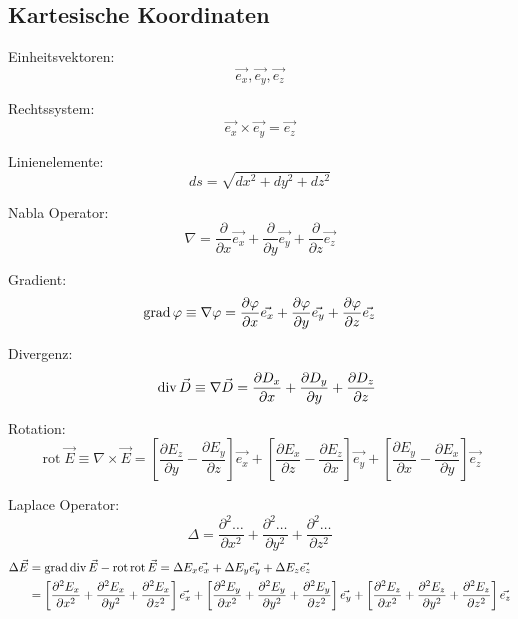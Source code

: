 \subsection{Kartesische Koordinaten}
\begin{description}
	\item Einheitsvektoren:
	      \[
		      \vec{e_{x}}, \vec{e_{y}}, \vec{e_{z}}
	      \]
	\item Rechtssystem:
	      \[
		      \vec{e_{x}} \times \vec{e_{y}}=\vec{e_{z}}
	      \]
	\item Linienelemente:
	      \[
		      ds=\sqrt{d x^{2}+d y^{2}+d z^{2}}
	      \]
	\item Nabla Operator:
	      \[
		      \nabla=\frac{\partial}{\partial x} \vec{e_{x}}+\frac{\partial}{\partial y} \vec{e_{y}}+\frac{\partial}{\partial z} \vec{e_{z}}
	      \]
	\item Gradient:
	      \[
		      \operatorname{grad} \varphi \equiv \nabla \varphi=\frac{\partial \varphi}{\partial x} \vec{e_{x}}+\frac{\partial \varphi}{\partial y} \vec{e_{y}}+\frac{\partial \varphi}{\partial z} \vec{e_{z}}
	      \]
	\item Divergenz:
	      \[
		      \quad \operatorname{div} \vec{D} \equiv \nabla \vec{D}=\frac{\partial D_{x}}{\partial x}+\frac{\partial D_{y}}{\partial y}+\frac{\partial D_{z}}{\partial z}
	      \]
	\item Rotation:
	      \[
		      \operatorname{rot} \vec{E} \equiv \nabla \times \vec{E} =
		      \left[\frac{\partial E_{z}}{\partial y}-\frac{\partial E_{y}}{\partial z}\right] \vec{e_{x}}+\left[\frac{\partial E_{x}}{\partial z}-\frac{\partial E_{z}}{\partial x}\right] \vec{e_{y}}+\left[\frac{\partial E_{y}}{\partial x}-\frac{\partial E_{x}}{\partial y}\right] \vec{e_{z}}
	      \]
	\item Laplace Operator:
	      \[
		      \Delta=\frac{\partial^{2} \ldots}{\partial x^{2}}+\frac{\partial^{2} \ldots}{\partial y^{2}}+\frac{\partial^{2} \ldots}{\partial z^{2}}
	      \]
	      \begin{align*}
		      \Delta \vec{E} & = \operatorname{grad} \operatorname{div} \vec{E}-\operatorname{rot} \operatorname{rot} \vec{E} = \Delta E_{x} \vec{e_{x}}+\Delta E_{y} \vec{e_{y}}+\Delta E_{z} \vec{e_{z}}                                                                                                                                                                                                                                                                                                                     \\
		                     & = \left[\frac{\partial^{2} E_{x}}{\partial x^{2}}+\frac{\partial^{2} E_{x}}{\partial y^{2}}+\frac{\partial^{2} E_{x}}{\partial z^{2}}\right] \vec{e_{x}}+\left[\frac{\partial^{2} E_{y}}{\partial x^{2}}+\frac{\partial^{2} E_{y}}{\partial y^{2}}+\frac{\partial^{2} E_{y}}{\partial z^{2}}\right] \vec{e_{y}}+ \left[\frac{\partial^{2} E_{z}}{\partial x^{2}}+\frac{\partial^{2} E_{z}}{\partial y^{2}}+\frac{\partial^{2} E_{z}}{\partial z^{2}}\right] \vec{e_{z}}
	      \end{align*}
\end{description}

